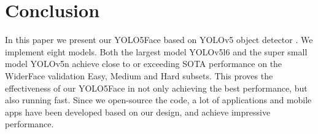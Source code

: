 \documentclass[conference]{IEEEtran}
\begin{document}
\section{Conclusion}
In this paper we present our YOLO5Face based on YOLOv5 object detector \cite{YOLOv5}. We implement eight models. Both the largest model YOLOv5l6 and the super small model YOLOv5n achieve close to or exceeding SOTA performance on the WiderFace \cite{WiderFace} validation Easy, Medium and Hard subsets. This proves the effectiveness of our YOLO5Face in not only achieving the best performance, but also running fast. Since we open-source the code, a lot of applications and mobile apps have been developed based on our design, and achieve impressive performance. 



\end{document}
